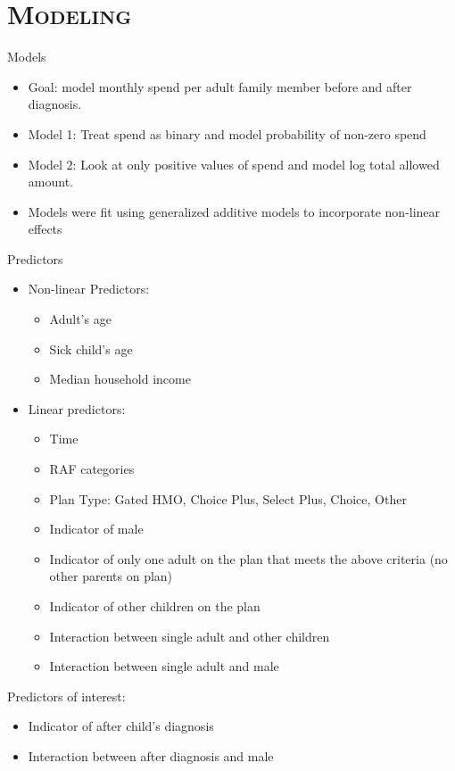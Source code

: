 \documentclass[xcolor=x11names,compress]{beamer}
\renewcommand{\(}{\begin{columns}}
\renewcommand{\)}{\end{columns}}
\newcommand{\<}[1]{\begin{column}{#1}}
\renewcommand{\>}{\end{column}}
\begin{document}
\section{\scshape Modeling}

\begin{frame}{Models}
\begin{itemize}
	\item Goal: model monthly spend per adult family member before and after diagnosis.
	\item Model 1: Treat spend as binary and model probability of non-zero spend
	\item Model 2: Look at only positive values of spend and model log total allowed amount. 
	\item Models were fit using generalized additive models to incorporate non-linear effects
\end{itemize}
\end{frame}

\begin{frame}{Predictors}
\begin{itemize}
\item Non-linear Predictors:  
\begin{itemize}
	\item Adult's age
	\item Sick child's age
	\item Median household income
\end{itemize}
\item Linear predictors:
\begin{itemize}
	\item Time
	\item RAF categories 
	\item Plan Type: Gated HMO, Choice Plus, Select Plus, Choice, Other
	\item Indicator of male
	\item Indicator of only one adult on the plan that meets the above criteria (no other parents on plan)
	\item Indicator of other children on the plan
	\item Interaction between single adult and other children
	\item Interaction between single adult and male
\end{itemize}  
\end{itemize}
\end{frame}

\begin{frame}
Predictors of interest:
\begin{itemize}
	\item Indicator of after child's diagnosis
	\item Interaction between after diagnosis and male
\end{itemize}
\end{frame}
\end{document}
